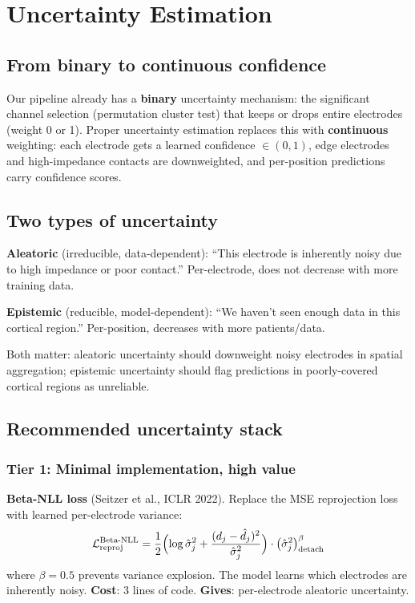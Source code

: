 \documentclass[11pt,letterpaper]{article}
\begin{document}
\section{Uncertainty Estimation}\label{sec:uncertainty}

\subsection{From binary to continuous confidence}

Our pipeline already has a \textbf{binary} uncertainty mechanism: the significant channel selection (permutation cluster test) that keeps or drops entire electrodes (weight 0 or 1). Proper uncertainty estimation replaces this with \textbf{continuous} weighting: each electrode gets a learned confidence $\in (0, 1)$, edge electrodes and high-impedance contacts are downweighted, and per-position predictions carry confidence scores.

\subsection{Two types of uncertainty}

\textbf{Aleatoric} (irreducible, data-dependent): ``This electrode is inherently noisy due to high impedance or poor contact.'' Per-electrode, does not decrease with more training data.

\textbf{Epistemic} (reducible, model-dependent): ``We haven't seen enough data in this cortical region.'' Per-position, decreases with more patients/data.

Both matter: aleatoric uncertainty should downweight noisy electrodes in spatial aggregation; epistemic uncertainty should flag predictions in poorly-covered cortical regions as unreliable.

\subsection{Recommended uncertainty stack}

\subsubsection{Tier 1: Minimal implementation, high value}

\textbf{Beta-NLL loss} (Seitzer et al., ICLR 2022). Replace the MSE reprojection loss with learned per-electrode variance:
\begin{equation}
\mathcal{L}_{\text{reproj}}^{\text{Beta-NLL}} = \frac{1}{2}\Bigl(\log \hat{\sigma}_j^2 + \frac{(d_j - \hat{d}_j)^2}{\hat{\sigma}_j^2}\Bigr) \cdot \bigl(\hat{\sigma}_j^2\bigr)^{\beta}_{\text{detach}}
\end{equation}
where $\beta = 0.5$ prevents variance explosion. The model learns which electrodes are inherently noisy. \textbf{Cost}: 3 lines of code. \textbf{Gives}: per-electrode aleatoric uncertainty.
\end{document}
